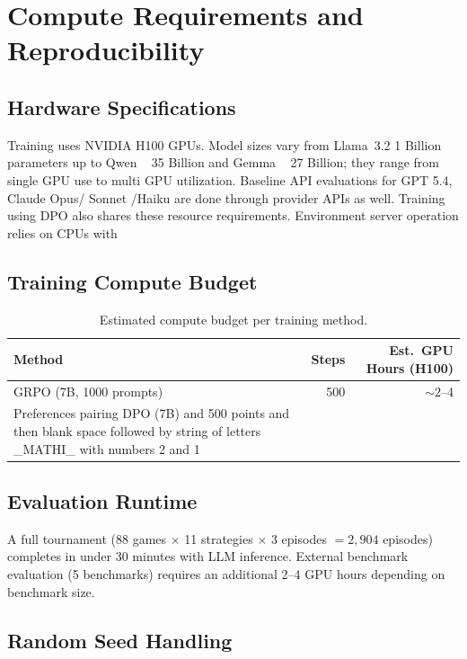 
\section{Compute Requirements and Reproducibility}
\label{app:reproducibility}

\subsection{Hardware Specifications}

Training uses NVIDIA H100 GPUs. Model sizes vary from Llama~3.2 1 Billion parameters up to Qwen ~ 35 Billion and Gemma ~ 27 Billion; they range from single GPU use to multi GPU utilization. Baseline API evaluations for GPT 5.4, Claude Opus/ Sonnet /Haiku are done through provider APIs as well. Training using DPO also shares these resource requirements. Environment server operation relies on CPUs with

\subsection{Training Compute Budget}

\begin{table}[h]
\centering\small
\caption{Estimated compute budget per training method.}
\begin{tabular}{@{}lrr@{}}
\toprule
\textbf{Method} & \textbf{Steps} & \textbf{Est.\ GPU Hours (H100)} \\
\midrule
GRPO (7B, 1000 prompts) & 500 & $\sim$2--4 \\
Preferences pairing DPO (7B) and 500 points and then blank space followed by string of letters _MATHI_ with numbers 2 and 1
\bottomrule
\end{tabular}
\end{table}

\subsection{Evaluation Runtime}

A full tournament (88 games $\times$ 11 strategies $\times$ 3 episodes
$= 2{,}904$ episodes) completes in under 30 minutes with LLM inference.
External benchmark evaluation (5 benchmarks) requires an additional
2--4 GPU hours depending on benchmark size.

\subsection{Random Seed Handling}

